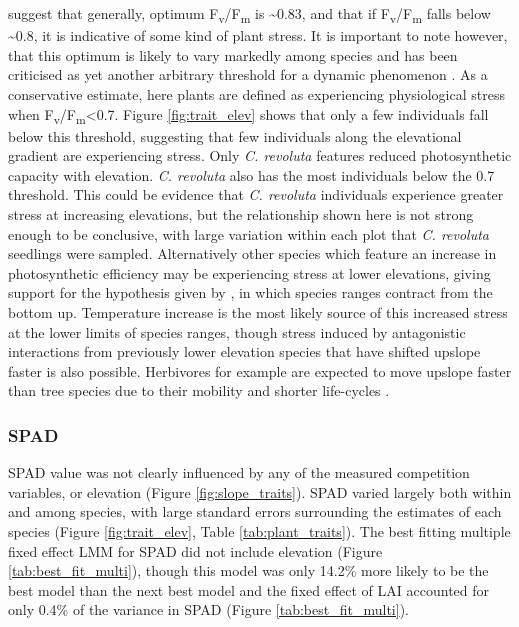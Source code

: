 \documentclass[a4paper,10pt,]{report}
\begin{document}
\citet{Maxwell2000} suggest that generally, optimum F\textsubscript{v}/F\textsubscript{m} is \textasciitilde0.83, and that if F\textsubscript{v}/F\textsubscript{m} falls below \textasciitilde0.8, it is indicative of some kind of plant stress. It is important to note however, that this optimum is likely to vary markedly among species and has been criticised as yet another arbitrary threshold for a dynamic phenomenon \citep{Ghouil2003}. As a conservative estimate, here plants are defined as experiencing physiological stress when F\textsubscript{v}/F\textsubscript{m}<0.7. Figure \ref{fig:trait_elev} shows that only a few individuals fall below this threshold, suggesting that few individuals along the elevational gradient are experiencing stress. Only \textit{C. revoluta} features reduced photosynthetic capacity with elevation. \textit{C. revoluta} also has the most individuals below the 0.7 threshold. This could be evidence that \textit{C. revoluta} individuals experience greater stress at increasing elevations, but the relationship shown here is not strong enough to be conclusive, with large variation within each plot that \textit{C. revoluta} seedlings were sampled. Alternatively other species which feature an increase in photosynthetic efficiency may be experiencing stress at lower elevations, giving support for the hypothesis given by \citet{Campbell2007}, in which species ranges contract from the bottom up. Temperature increase is the most likely source of this increased stress at the lower limits of species ranges, though stress induced by antagonistic interactions from previously lower elevation species that have shifted upslope faster is also possible. Herbivores for example are expected to move upslope faster than tree species due to their mobility and shorter life-cycles \citep{Chen2011}.

\subsubsection*{SPAD}
SPAD value was not clearly influenced by any of the measured competition variables, or elevation (Figure \ref{fig:slope_traits}). SPAD varied largely both within and among species, with large standard errors surrounding the estimates of each species (Figure \ref{fig:trait_elev}, Table \ref{tab:plant_traits}). The best fitting multiple fixed effect LMM for SPAD did not include elevation (Figure \ref{tab:best_fit_multi}), though this model was only 14.2\% more likely to be the best model than the next best model and the fixed effect of LAI accounted for only 0.4\% of the variance in SPAD (Figure \ref{tab:best_fit_multi}). 
\end{document}
